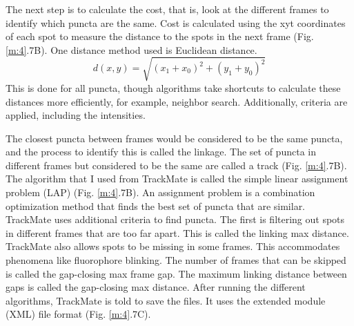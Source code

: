The next step is to calculate the cost, that is, look at the different frames to identify which puncta are the same. Cost is calculated using the xyt coordinates of each spot to measure the distance to the spots in the next frame (Fig. \ref{m:4}.7B). One distance method used is Euclidean distance. \begin{equation}d(x, y) = \sqrt{(x_{1} + x_{0})^2 + (y_{1} + y_{0})^2}\end{equation} This is done for all puncta, though algorithms take shortcuts to calculate these distances more efficiently, for example, neighbor search. Additionally, criteria are applied, including the intensities.

The closest puncta between frames would be considered to be the same puncta, and the process to identify this is called the linkage. The set of puncta in different frames but considered to be the same are called a track (Fig. \ref{m:4}.7B). The algorithm that I used from TrackMate is called the simple linear assignment problem (LAP) (Fig. \ref{m:4}.7B). An assignment problem is a combination optimization method that finds the best set of puncta that are similar. TrackMate uses additional criteria to find puncta. The first is filtering out spots in different frames that are too far apart. This is called the linking max distance. TrackMate also allows spots to be missing in some frames. This accommodates phenomena like fluorophore blinking. The number of frames that can be skipped is called the gap-closing max frame gap. The maximum linking distance between gaps is called the gap-closing max distance. After running the different algorithms, TrackMate is told to save the files. It uses the extended module (XML) file format (Fig. \ref{m:4}.7C).


